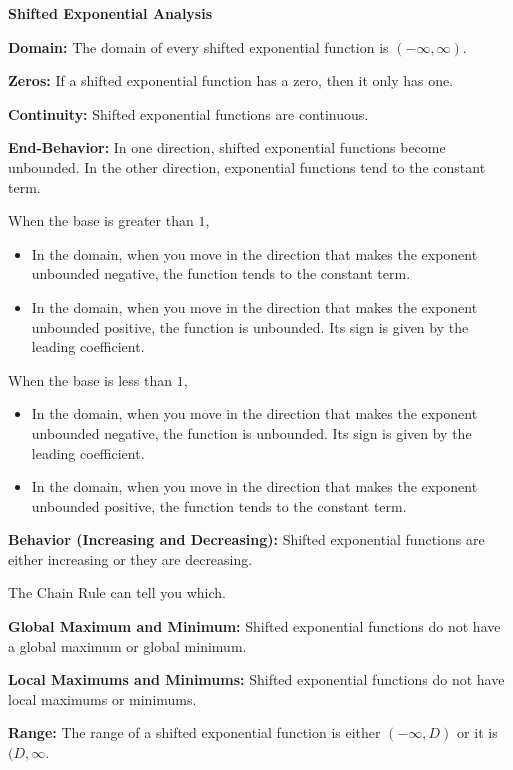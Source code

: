 \documentclass{ximera}
\begin{document}
\begin{summary}\textbf{\textcolor{red!70!yellow}{Shifted Exponential Analysis}}


\textbf{Domain:} The domain of every shifted exponential function is $(-\infty, \infty)$.

\textbf{Zeros:} If a shifted exponential function has a zero, then it only has one.

\textbf{Continuity:} Shifted exponential functions are continuous.

\textbf{End-Behavior:} In one direction, shifted exponential functions become unbounded. In the other direction, exponential functions tend to the constant term.


When the base is greater than $1$,
\begin{itemize}
\item In the domain, when you move in the direction that makes the exponent unbounded negative, the function tends to the constant term.
\item In the domain, when you move in the direction that makes the exponent unbounded positive, the function is unbounded. Its sign is given by the leading coefficient.
\end{itemize}




When the base is less than $1$,
\begin{itemize}
\item In the domain, when you move in the direction that makes the exponent unbounded negative, the function is unbounded. Its sign is given by the leading coefficient.
\item In the domain, when you move in the direction that makes the exponent unbounded positive, the function tends to the constant term.
\end{itemize}




\textbf{Behavior (Increasing and Decreasing):} Shifted exponential functions are either increasing or they are decreasing.

The Chain Rule can tell you which.

\textbf{Global Maximum and Minimum:}  Shifted exponential functions do not have a global maximum or global minimum.

\textbf{Local Maximums and Minimums:} Shifted exponential functions do not have local maximums or minimums.

\textbf{Range:} The range of a shifted exponential function is either $(-\infty, D)$ or it is $(D, \infty$.



\end{summary}
\end{document}
